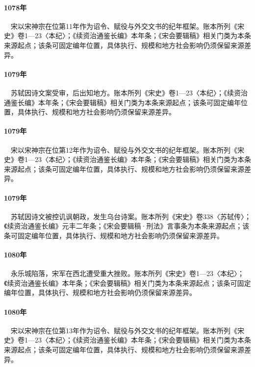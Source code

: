 \paragraph{1078年}　宋以宋神宗在位第11年作为诏令、赋役与外交文书的纪年框架。账本所列《宋史》卷1—23〈本纪〉；《续资治通鉴长编》本年条；《宋会要辑稿》相关门类为本条来源起点；该条可固定编年位置，具体执行、规模和地方社会影响仍须保留来源差异。

\paragraph{1079年}　苏轼因诗文案受审，后出知地方。账本所列《宋史》卷1—23〈本纪〉；《续资治通鉴长编》本年条；《宋会要辑稿》相关门类为本条来源起点；该条可固定编年位置，具体执行、规模和地方社会影响仍须保留来源差异。

\paragraph{1079年}　宋以宋神宗在位第12年作为诏令、赋役与外交文书的纪年框架。账本所列《宋史》卷1—23〈本纪〉；《续资治通鉴长编》本年条；《宋会要辑稿》相关门类为本条来源起点；该条可固定编年位置，具体执行、规模和地方社会影响仍须保留来源差异。

\paragraph{1079年}　苏轼因诗文被控讥讽朝政，发生乌台诗案。账本所列《宋史》卷338〈苏轼传〉；《续资治通鉴长编》元丰二年条；《宋会要辑稿·刑法》言事条为本条来源起点；该条可固定编年位置，具体执行、规模和地方社会影响仍须保留来源差异。

\paragraph{1080年}　永乐城陷落，宋军在西北遭受重大挫败。账本所列《宋史》卷1—23〈本纪〉；《续资治通鉴长编》本年条；《宋会要辑稿》相关门类为本条来源起点；该条可固定编年位置，具体执行、规模和地方社会影响仍须保留来源差异。

\paragraph{1080年}　宋以宋神宗在位第13年作为诏令、赋役与外交文书的纪年框架。账本所列《宋史》卷1—23〈本纪〉；《续资治通鉴长编》本年条；《宋会要辑稿》相关门类为本条来源起点；该条可固定编年位置，具体执行、规模和地方社会影响仍须保留来源差异。

